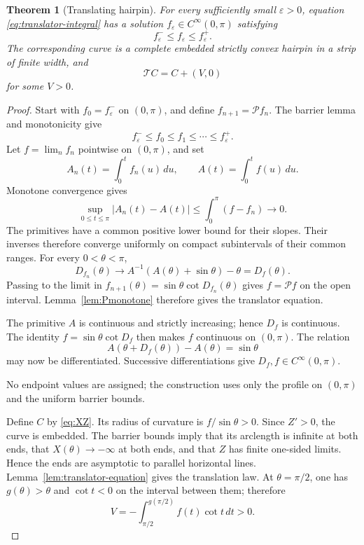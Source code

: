 \documentclass[11pt]{article}
\newtheorem{theorem}{Theorem}[section]
\theoremstyle{remark}
\newcommand{\Tmap}{\mathcal T}
\newcommand{\eps}{\varepsilon}
\begin{document}
\begin{theorem}[Translating hairpin]\label{thm:hairpin}
For every sufficiently small \(\eps>0\), equation
\eqref{eq:translator-integral} has a solution
\(f_\eps\in C^\infty(0,\pi)\) satisfying
\[
   f_\eps^-\leq f_\eps\leq f_\eps^+.
\]
The corresponding curve is a complete embedded strictly convex hairpin in a
strip of finite width, and
\[
   \Tmap C=C+(V,0)
\]
for some \(V>0\).
\end{theorem}

\begin{proof}
Start with \(f_0=f_\eps^-\) on \((0,\pi)\), and define
\(f_{n+1}=\mathcal Pf_n\).  The barrier lemma and monotonicity give
\[
   f_\eps^-\leq f_0\leq f_1\leq\cdots\leq f_\eps^+.
\]
Let \(f=\lim_n f_n\) pointwise on \((0,\pi)\), and set
\[
   A_n(t)=\int_0^t f_n(u)\,du,
   \qquad
   A(t)=\int_0^t f(u)\,du.
\]
Monotone convergence gives
\[
   \sup_{0\leq t\leq\pi}|A_n(t)-A(t)|
   \leq\int_0^\pi(f-f_n)\longrightarrow0.
\]
The primitives have a common positive lower bound for their slopes.  Their
inverses therefore converge uniformly on compact subintervals of their common
ranges.  For every \(0<\theta<\pi\),
\[
   D_{f_n}(\theta)
   \longrightarrow
   A^{-1}(A(\theta)+\sin\theta)-\theta
   =D_f(\theta).
\]
Passing to the limit in
\(f_{n+1}(\theta)=\sin\theta\cot D_{f_n}(\theta)\) gives
\(f=\mathcal Pf\) on the open interval.  Lemma~\ref{lem:Pmonotone}
therefore gives the translator equation.

The primitive \(A\) is continuous and strictly increasing; hence \(D_f\)
is continuous.  The identity \(f=\sin\theta\cot D_f\) then makes \(f\)
continuous on \((0,\pi)\).  The relation
\[
   A(\theta+D_f(\theta))-A(\theta)=\sin\theta
\]
may now be differentiated.  Successive differentiations give
\(D_f,f\in C^\infty(0,\pi)\).

No endpoint values are assigned; the construction uses only the profile on
\((0,\pi)\) and the uniform barrier bounds.

Define \(C\) by \eqref{eq:XZ}.  Its radius of curvature is
\(f/\sin\theta>0\).  Since \(Z'>0\), the curve is embedded.  The barrier
bounds imply that its arclength is infinite at both ends, that
\(X(\theta)\to-\infty\) at both ends, and that \(Z\) has finite one-sided
limits.  Hence the ends are asymptotic to parallel horizontal lines.
Lemma~\ref{lem:translator-equation} gives the translation law.  At
\(\theta=\pi/2\), one has \(g(\theta)>\theta\) and \(\cot t<0\) on the
interval between them; therefore
\[
   V=-\int_{\pi/2}^{g(\pi/2)}f(t)\cot t\,dt>0.
\]
\end{proof}
\end{document}
